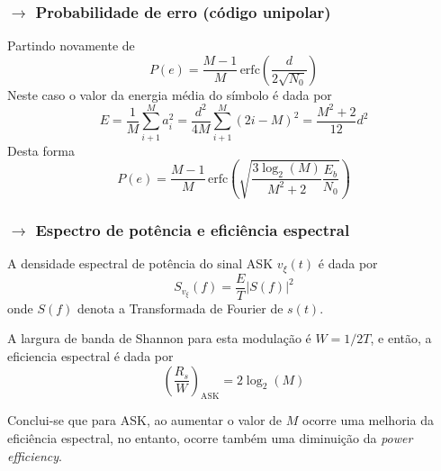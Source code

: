 \subsubsection[5.1.2 Probabilidade de erro (código unipolar)]{$\rightarrow$ Probabilidade de erro (código unipolar)}
{\small
Partindo novamente de 
$$
    P(e) = \frac{M-1}{M}\, \text{erfc}\left( \frac{d}{2\sqrt{N_0}} \right)
$$
Neste caso o valor da energia média do símbolo é dada por
$$
    E = \frac{1}{M} \sum_{i+1}^{M} a_i^2 = \frac{d^2}{4M} \sum_{i+1}^{M} (2i-M)^2 = \frac{M^2+2}{12}d^2
$$
Desta forma
$$
    P(e) = \frac{M-1}{M}\, \text{erfc}\left( \sqrt{\frac{3 \log_2(M)}{M^2+2} \frac{E_b}{N_0}} \right)
$$
}
\subsubsection[5.1.3 Espectro de potência e eficiência espectral]{$\rightarrow$ Espectro de potência e eficiência espectral}

A densidade espectral de potência do sinal ASK $v_\xi(t)$ é dada por
$$
    S_{v_\xi}(f) = \frac{E}{T}\left|S(f)\right|^2
$$
onde $S(f)$ denota a Transformada de Fourier de $s(t)$.

\vspace{0.5em}
\noindent A largura de banda de Shannon para esta modulação é $W = 1/2T$, e então, a eficiencia espectral é dada por
$$
    \left(\frac{R_s}{W}\right)_{\text{ASK}} = 2 \log_2(M)
$$

\vspace{0.5em}
\noindent Conclui-se que para ASK, ao aumentar o valor de $M$ ocorre uma melhoria da eficiência espectral, no entanto, ocorre também uma diminuição da \textit{power efficiency}.
